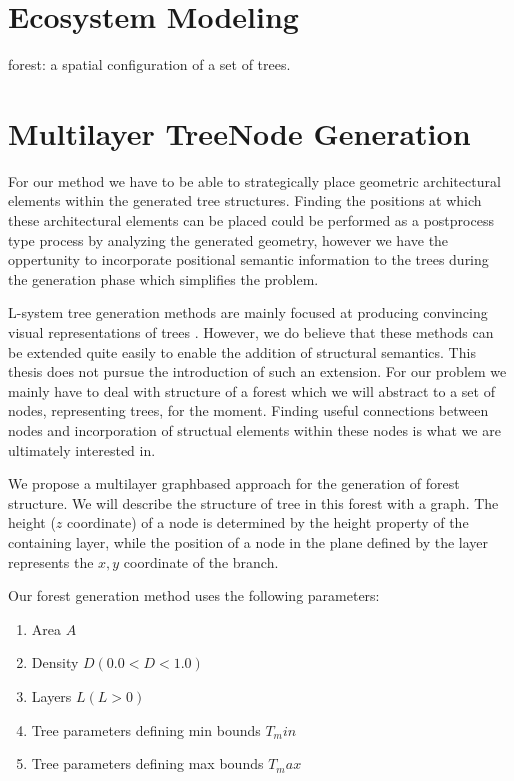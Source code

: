 
\section{Ecosystem Modeling}


forest: a spatial configuration of a set of trees.  


\section{Multilayer TreeNode Generation}


For our method we have to be able to strategically place geometric architectural elements within the generated tree structures. Finding the positions at which these architectural elements can be placed could be performed as a postprocess type process by analyzing the generated geometry, however we have the oppertunity to incorporate positional semantic information to the trees during the generation phase which simplifies the problem. 

L-system tree generation methods are mainly focused at producing convincing visual representations of trees \citep{Prezmyslaw}. However, we do believe that these methods can be extended quite easily to enable the addition of structural semantics. This thesis does not pursue the introduction of such an extension. For our problem we mainly have to deal with structure of a forest which we will abstract to a set of nodes, representing trees, for the moment. Finding useful connections between nodes and incorporation of structual elements within these nodes is what we are ultimately interested in.    

We propose a multilayer graphbased approach for the generation of forest structure. We will describe the structure of tree in this forest with a graph. The height ($z$ coordinate) of a node is determined by the height property of the containing layer, while the position of a node in the plane defined by the layer represents the $x,y$ coordinate of the branch.  

Our forest generation method uses the following parameters: 

\begin{enumerate}
\item Area  $A$  
\item Density $D (0.0 < D < 1.0)$  
\item Layers $L (L > 0)$ 
\item Tree parameters defining min bounds $T_min$
\item Tree parameters defining max bounds $T_max$
\end{enumerate}

